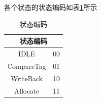 \documentclass{../source/zjureport}
\begin{document}
            各个状态的状态编码如表\ref{状态编码}所示

            \begin{table}[H]
                \centering
                \begin{tabular}{|c|c|}
                \hline
                \multicolumn{2}{|c|}{\textbf{状态编码}} \\ \hline
                IDLE                 & 00           \\\hline
                CompareTag           & 01           \\\hline
                WriteBack            & 10           \\\hline
                Allocate             & 11          \\\hline
                \end{tabular}
                \caption{状态编码}
                \label{状态编码}
            \end{table}
\end{document}

